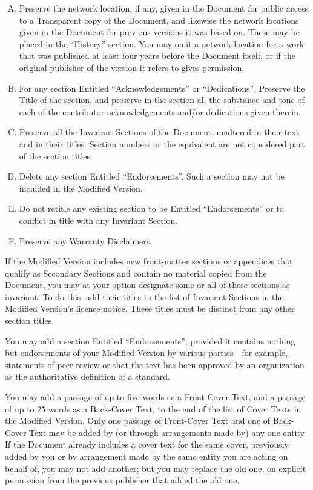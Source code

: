 \begin{enumerate}[A.]
\item    Preserve the network location, if any, given in
the Document for public access to a Transparent copy of the
Document, and likewise the network locations given in the
Document for previous versions it was based on. These may be
placed in the “History” section. You may omit a network
location for a work that was published at least four years
before the Document itself, or if the original publisher of
the version it refers to gives permission.

\item For any section Entitled “Acknowledgements”
or “Dedications”, Preserve the Title of the section,
and preserve in the section all the substance and tone of
each of the contributor acknowledgements and/or dedications
given therein.

\item    Preserve all the Invariant Sections of the Document,
unaltered in their text and in their titles. Section numbers or
the equivalent are not considered part of the section titles.

\item    Delete any section Entitled “Endorsements”. Such
a section may not be included in the Modified Version.

\item    Do not retitle any existing section to be Entitled
“Endorsements” or to conflict in title with any Invariant
Section.

\item    Preserve any Warranty Disclaimers. 
\end{enumerate}

If the Modified Version includes new front-matter sections
or appendices that qualify as Secondary Sections and contain
no material copied from the Document, you may at your option
designate some or all of these sections as invariant. To do
this, add their titles to the list of Invariant Sections in
the Modified Version’s license notice. These titles must
be distinct from any other section titles.

You may add a section Entitled “Endorsements”, provided
it contains nothing but endorsements of your Modified Version
by various parties—for example, statements of peer review
or that the text has been approved by an organization as the
authoritative definition of a standard.

You may add a passage of up to five words as a Front-Cover
Text, and a passage of up to 25 words as a Back-Cover Text,
to the end of the list of Cover Texts in the Modified
Version. Only one passage of Front-Cover Text and one of
Back-Cover Text may be added by (or through arrangements
made by) any one entity. If the Document already includes a
cover text for the same cover, previously added by you or by
arrangement made by the same entity you are acting on behalf
of, you may not add another; but you may replace the old one,
on explicit permission from the previous publisher that added
the old one.

